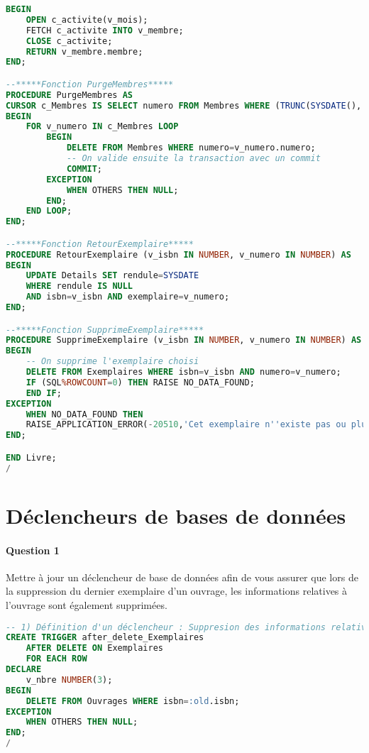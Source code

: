 \documentclass[10pt, oneside]{article}
\begin{document}
\begin{lstlisting}[language=sql, title=Question 12, label=QV12]
BEGIN
	OPEN c_activite(v_mois);
	FETCH c_activite INTO v_membre;
	CLOSE c_activite;
	RETURN v_membre.membre;
END;

--*****Fonction PurgeMembres*****
PROCEDURE PurgeMembres AS
CURSOR c_Membres IS SELECT numero FROM Membres WHERE (TRUNC(SYSDATE(), 'YYYY') - TRUNC(ADD_MONTHS(adhesion, duree), 'YYYY'))>3;
BEGIN 
	FOR v_numero IN c_Membres LOOP
		BEGIN
			DELETE FROM Membres WHERE numero=v_numero.numero;
			-- On valide ensuite la transaction avec un commit
			COMMIT;
		EXCEPTION	
			WHEN OTHERS THEN NULL;
		END;
	END LOOP;
END;

--*****Fonction RetourExemplaire*****
PROCEDURE RetourExemplaire (v_isbn IN NUMBER, v_numero IN NUMBER) AS
BEGIN
	UPDATE Details SET rendule=SYSDATE
	WHERE rendule IS NULL
	AND isbn=v_isbn AND exemplaire=v_numero;
END;

--*****Fonction SupprimeExemplaire*****
PROCEDURE SupprimeExemplaire (v_isbn IN NUMBER, v_numero IN NUMBER) AS
BEGIN
	-- On supprime l'exemplaire choisi
	DELETE FROM Exemplaires WHERE isbn=v_isbn AND numero=v_numero;
	IF (SQL%ROWCOUNT=0) THEN RAISE NO_DATA_FOUND;
	END IF;
EXCEPTION
	WHEN NO_DATA_FOUND THEN
	RAISE_APPLICATION_ERROR(-20510,'Cet exemplaire n''existe pas ou plus dans la bibliothèque');
END;

END Livre;
/
\end{lstlisting}


\section{Déclencheurs de bases de données}


\paragraph{Question 1} Mettre à jour un déclencheur de base de données afin de vous assurer que lors de la suppression du dernier exemplaire d'un ouvrage, les informations relatives à l'ouvrage sont également supprimées.

\begin{lstlisting}[language=sql, title=Question 1, label=QVI1]
-- 1) Définition d'un déclencheur : Suppresion des informations relatives à un ouvrage lors de sa suppression
CREATE TRIGGER after_delete_Exemplaires
	AFTER DELETE ON Exemplaires
	FOR EACH ROW 
DECLARE
	v_nbre NUMBER(3);
BEGIN
	DELETE FROM Ouvrages WHERE isbn=:old.isbn;
EXCEPTION
	WHEN OTHERS THEN NULL;
END;
/
\end{lstlisting}
\end{document}

